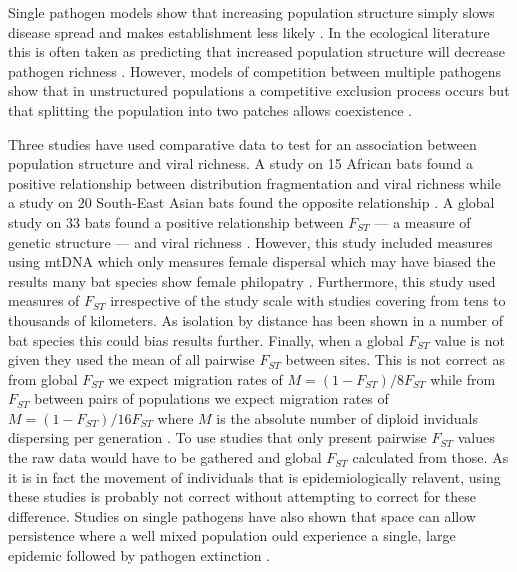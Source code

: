 



Single pathogen models show that increasing population structure simply slows disease spread and makes establishment less likely \cite{colizza2007invasion, vespignani2008reaction}.
In the ecological literature this is often taken as predicting that increased population structure will decrease pathogen richness \cite{nunn2003comparative, morand2000wormy, poulin2014parasite, poulin2000diversity, altizer2003social}.
However, models of competition between multiple pathogens show that in unstructured populations a competitive exclusion process occurs but that splitting the population into two patches allows coexistence \cite{qiu2013vector,allen2004sis, nunes2006localized}.



Three studies have used comparative data to test for an association between population structure and viral richness.
A study on 15 African bats found a positive relationship between distribution fragmentation and viral richness \cite{maganga2014bat} while a study on 20 South-East Asian bats found the opposite relationship \cite{gay2014parasite}. 
A global study on 33 bats found a positive relationship between $F_{ST}$ --- a measure of genetic structure --- and viral richness \cite{turmelle2009correlates}. 
However, this study included measures using mtDNA which only measures female dispersal which may have biased the results many bat species show female philopatry \cite{kerth2002extreme, hulva2010mechanisms}.
Furthermore, this study used measures of $F_{ST}$ irrespective of the study scale with studies covering from tens \cite{mccracken1981social} to thousands \cite{petit1999male} of kilometers.
As isolation by distance has been shown in a number of bat species \cite{burland1999population, hulva2010mechanisms, o2015genetic, vonhof2015range} this could bias results further.
Finally, when a global $F_{ST}$ value is not given they used the mean of all pairwise $F_{ST}$ between sites.
This is not correct as from global $F_{ST}$ we expect migration rates of $M = (1-F_{ST})/8F_{ST}$ while from $F_{ST}$ between pairs of populations we expect migration rates of $M = (1-F_{ST})/16F_{ST}$ where $M$ is the absolute number of diploid inviduals dispersing per generation \cite{slatkin1995measure}.
To use studies that only present pairwise $F_{ST}$ values the raw data would have to be gathered and global $F_{ST}$ calculated from those.
As it is in fact the movement of individuals that is epidemiologically relavent, using these studies is probably not correct without attempting to correct for these difference.
Studies on single pathogens have also shown that space can allow persistence where a well mixed population ould experience a single, large epidemic followed by pathogen extinction \cite{blackwood2013resolving, pons2014insights, plowright2011urban}.


